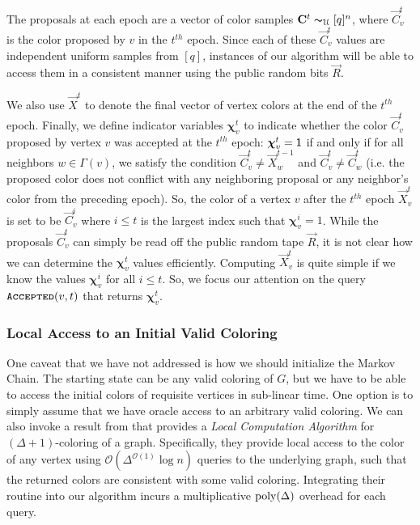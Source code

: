 The proposals at each epoch are a vector of color samples $\vec C^{t} \thicksim_{\mathcal U} [q]^n$,
where $\vec C^t_v$ is the color proposed by $v$ in the $t^{th}$ epoch.
Since each of these $\vec C^t_v$ values are independent uniform samples from $[q]$,
instances of our algorithm will be able to access them in a consistent manner using the public random bits $\vec R$.

We also use $\vec X^t$ to denote the final vector of vertex colors at the end of the $t^{th}$ epoch.
Finally, we define indicator variables $\bm \chi^t_v$ to indicate whether the color $\vec C^t_v$ proposed by vertex $v$
was accepted at the $t^{th}$ epoch: $\bm \chi^t_v = \ONE$ if and only if for all neighbors $w\in \Gamma(v)$,
we satisfy the condition $\vec C^t_v\not= \vec X^{t-1}_w$ and $\vec C^t_v\not= \vec C^t_w$
(i.e. the proposed color does not conflict with any neighboring proposal or any neighbor's color from the preceding epoch).
So, the color of a vertex $v$ after the $t^{th}$ epoch $\vec X^t_v$ is set to be $\vec C^i_v$
where $i\le t$ is the largest index such that $\bm \chi^i_v=1$.
While the proposals $\vec C^t_v$ can simply be read off the public random tape $\vec R$,
it is not clear how we can determine the $\bm \chi^t_v$ values efficiently.
Computing $\vec X^t_v$ is quite simple if we know the values $\bm\chi^i_v$ for all $i\le t$.
So, we focus our attention on the query $\func{Accepted}(v,t)$ that returns $\bm\chi^t_v$.


\subsubsection{Local Access to an Initial Valid Coloring}
\label{sec:local_access_to_an_initial_valid_coloring}
One caveat that we have not addressed is how we should initialize the Markov Chain.
The starting state can be any valid coloring of $G$, but we have to be able to access the initial colors of requisite vertices in sub-linear time.
One option is to simply assume that we have oracle access to an arbitrary valid coloring.
We can also invoke a result from \cite{coloring_initialize} that provides a \emph{Local Computation Algorithm} for $(\Delta+1)$-coloring of a graph.
Specifically, they provide local access to the color of any vertex using $\mathcal O(\Delta^{\mathcal O(1)}\log n)$ queries to the underlying graph,
such that the returned colors are consistent with some valid coloring.
Integrating their routine into our algorithm incurs a multiplicative $\poly(\Delta)$ overhead for each query.

